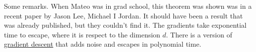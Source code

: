 	Some remarks. When Mateo was in grad school, this theorem was shown was in a recent paper by Jason Lee, Michael I Jordan. It should have been a result that was already published, but they couldn't find it. The gradients take exponential time to escape, where it is respect to the dimension $d$. There is a version of \hyperref[def:gradient_descent]{gradient descent} that adds noise and escapes in polynomial time. 
	
